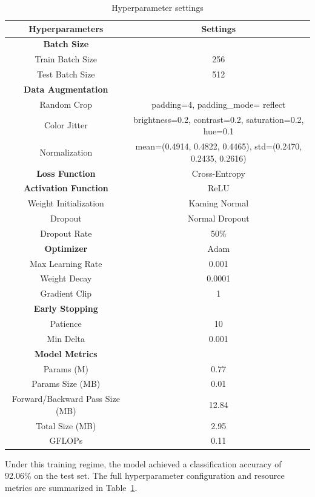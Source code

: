 \documentclass{article}
\begin{document}
\begin{table}[H]
  \centering
  \caption{Hyperparameter settings}
  \label{tab:model_setting}
  \begin{tabular}{cc}
    \toprule
    \textbf{Hyperparameters} & \textbf{Settings} \\
    \midrule
    \textbf{Batch Size} &\\
    Train Batch Size & 256\\
    Test Batch Size & 512\\
    \midrule
    \textbf{Data Augmentation} &\\
    Random Crop & padding=4, padding\_mode= reflect \\
    Color Jitter & brightness=0.2, contrast=0.2, saturation=0.2, hue=0.1 \\
    Normalization & mean=(0.4914, 0.4822, 0.4465), std=(0.2470, 0.2435, 0.2616)\\
    \midrule
    \textbf{Loss Function} & Cross-Entropy \\
    \midrule
    \textbf{Activation Function} & ReLU\\
    Weight Initialization & Kaming Normal\\
    Dropout & Normal Dropout \\
    Dropout Rate & 50\%\\
    \midrule
    \textbf{Optimizer} & Adam \\
    Max Learning Rate & 0.001\\
    Weight Decay & 0.0001\\
    Gradient Clip & 1\\
    \midrule
    \textbf{Early Stopping} &\\
    Patience & 10 \\
    Min Delta & 0.001\\
    \midrule
    \textbf{Model Metrics}\\
    Params (M) & 0.77\\
    Params Size (MB) & 0.01\\
    Forward/Backward Pass Size (MB) & 12.84\\
    Total Size (MB) & 2.95\\
    GFLOPs & 0.11\\
    \bottomrule
  \end{tabular}
\end{table}

 Under this training regime, the model achieved a classification accuracy of 92.06\% on the test set. The full hyperparameter configuration and resource metrics are summarized in Table \ref{tab:model_setting}.
\end{document}

